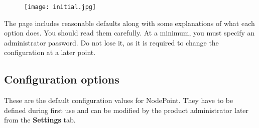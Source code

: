 \documentclass[11pt]{article}
\begin{document}
\begin{figure}[h]
\texttt{[image: initial.jpg]}
\end{figure}

The page includes reasonable defaults along with some explanations of what each option does. You should read them carefully. At a minimum, you must specify an administrator password. Do not lose it, as it is required to change the configuration at a later point.

\subsection{Configuration options}

These are the default configuration values for NodePoint. They have to be defined during first use and can be modified by the product administrator later from the \textbf{Settings} tab.
\end{document}
